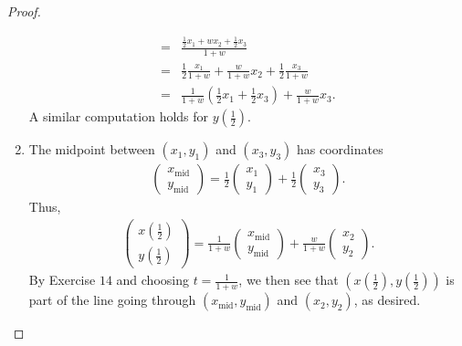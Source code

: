 \begin{proof}
\begin{enumerate}
\begin{align*}
           =& \frac{\frac{1}{2} x_1 + wx_2 + \frac{1}{2} x_3}{1+w}\\
           =& \frac{1}{2}\frac{x_1}{1+w} + \frac{w}{1+w}x_2 + \frac{1}{2}\frac{x_3}{1+w}\\
           =& \frac{1}{1+w}\left(\frac{1}{2}x_1 + \frac{1}{2}x_3\right) + \frac{w}{1+w}x_3.
        \end{align*}
        A similar computation holds for $y\left(\frac{1}{2}\right)$.
            \item The midpoint between $(x_1,y_1)$ and $(x_3,y_3)$ has coordinates 
            \begin{align*}
                \left(\begin{array}{c}
                    x_{\text{mid}}\\ 
                    y_{\text{mid}}\end{array}\right) 
                = \frac{1}{2}
                \left(\begin{array}{c}
                    x_1\\ 
                    y_1\end{array}\right) 
                + \frac{1}{2}
                \left(\begin{array}{c}
                    x_3\\ 
                    y_3\end{array}\right).
            \end{align*}
            Thus,
            \begin{align*}
                \left(\begin{array}{c}
                    x\left(\frac{1}{2}\right)\\ 
                    y\left(\frac{1}{2}\right)\end{array}\right) 
                = \frac{1}{1+w}
                \left(\begin{array}{c}
                    x_{\text{mid}}\\ 
                    y_{\text{mid}}\end{array}\right) 
                + \frac{w}{1+w}
                \left(\begin{array}{c}
                    x_2\\ 
                    y_2\end{array}\right).
            \end{align*}
            By Exercise $14$ and choosing $t = \frac{1}{1+w}$, we then see that $\left(x\left(\frac{1}{2}\right),y\left(\frac{1}{2}\right)\right)$ is part of the line going through $(x_{\text{mid}},y_{\text{mid}})$ and $(x_2,y_2)$, as desired.

\end{enumerate}
\end{proof}
